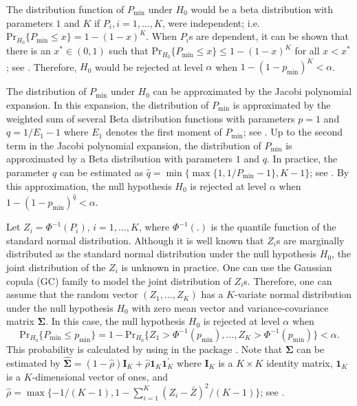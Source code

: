 \noindent {} The distribution function of  $P_\text{min}$ under $H_0$ would be a beta distribution with parameters $1$ and $K$ if $P_i, i=1, \ldots, K$, were independent; i.e. $\text{Pr}_{H_0} \{P_{\text{min}} \leq x \}=1-\left(1-x\right)^K$. When $P_i$s are dependent, it can be shown that there is an $x^{*}\in \left(0,1\right)$ such that $\text{Pr}_{H_0} \{P_{\text{min}} \leq x \} \leq 1-\left(1-x\right)^K$ for all $x < x^{*}$; see \citet{SAKK:2015}. Therefore, $H_0$ would be rejected at level $\alpha$ when $1-\left(1-p_\text{min} \right)^K<\alpha$. 

\noindent {} The distribution of $P_{\text{min}}$ under $H_0$ can be approximated by the Jacobi polynomial expansion. In this expansion, the distribution of $P_{\min}$ is approximated by the weighted sum of several Beta distribution functions with parameters $p=1$ and $q=1/E_1-1$ where $E_1$ denotes the first moment of $P_{\min}$; see \citet{SKK:2018}. Up to the second term in the Jacobi polynomial expansion, the  distribution of $P_{\min}$ is approximated by a Beta distribution with parameters $1$ and $q$. In practice, the parameter $q$ can be estimated as $\hat{q}=\min \{ \max \{ 1,1/P_{\min}-1 \}, K-1 \}$; see \citet{SKK:2018}. By this approximation, the null hypothesis $H_0$ is rejected at level $\alpha$ when $1-\left(1-p_{\min}\right)^{\hat{q}}<\alpha$.

\noindent {} Let $Z_i=\Phi^{-1} \left(P_i\right)$, $i=1,\ldots ,K$, where $\Phi^{-1}\left(.\right)$ is the quantile function of the standard normal distribution. Although it is well known that $Z_i$s are marginally distributed as the standard normal distribution under the null hypothesis $H_0$, the joint distribution of the $Z_i$ is unknown in practice. One can use the Gaussian copula (GC) family to model the joint distribution of $Z_i$s. Therefore, one can assume that the random vector $\left(Z_1,\ldots,Z_K\right)$ has a $K$-variate normal distribution under the null hypothesis $H_0$ with zero mean vector and variance-covariance matrix $\mathbold\Sigma$. In this case, the null hypothesis $H_0$ is rejected at level $\alpha$ when
\[ \text{Pr}_{H_0} \{P_{\min} \leq p_{\min} \}=1-\text{Pr}_{H_0} \{ Z_1> \Phi^{-1}\left(p_{\min}\right), \ldots , Z_K> \Phi^{-1}\left(p_{\min}\right) \}< \alpha. \]
This probability is calculated by using  in the package . Note that $\mathbold{\Sigma}$ can be estimated by $\hat{\mathbold{\Sigma}}=\left(1-\hat{\rho}\right)\mathbold{I}_K+\hat{\rho}\mathbold{1}_K \mathbold{1}^{'}_K$ where $\mathbold{I}_K$ is a $K \times K$ identity matrix, $\mathbold{1}_K$ is a $K$-dimensional vector of ones, and $\hat{\rho}=\max \{-1/\left(K-1\right), 1-\sum_{i=1}^K \left(Z_i-\bar{Z}\right)^2/\left(K-1\right) \}$; see \citet{SKK:2018}.

